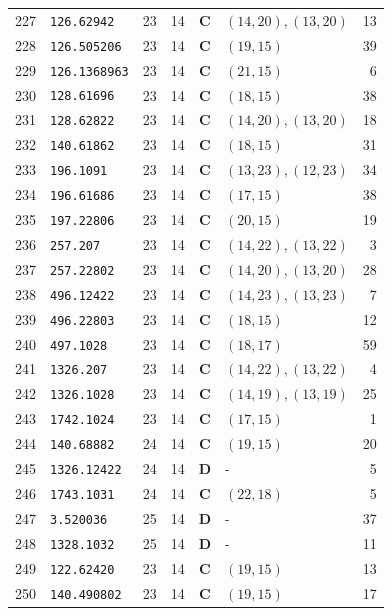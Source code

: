 \documentclass[11pt,a4paper]{article}
\begin{document}
\begin{small}
\begin{longtable}{r l c c c l r}
227 & \texttt{126.62942} & 23 & 14 & \textbf{C} & $(14,20), (13,20)$ & 13 \\
228 & \texttt{126.505206} & 23 & 14 & \textbf{C} & $(19,15)$ & 39 \\
229 & \texttt{126.1368963} & 23 & 14 & \textbf{C} & $(21,15)$ & 6 \\
230 & \texttt{128.61696} & 23 & 14 & \textbf{C} & $(18,15)$ & 38 \\
231 & \texttt{128.62822} & 23 & 14 & \textbf{C} & $(14,20), (13,20)$ & 18 \\
232 & \texttt{140.61862} & 23 & 14 & \textbf{C} & $(18,15)$ & 31 \\
233 & \texttt{196.1091} & 23 & 14 & \textbf{C} & $(13,23), (12,23)$ & 34 \\
234 & \texttt{196.61686} & 23 & 14 & \textbf{C} & $(17,15)$ & 38 \\
235 & \texttt{197.22806} & 23 & 14 & \textbf{C} & $(20,15)$ & 19 \\
236 & \texttt{257.207} & 23 & 14 & \textbf{C} & $(14,22), (13,22)$ & 3 \\
237 & \texttt{257.22802} & 23 & 14 & \textbf{C} & $(14,20), (13,20)$ & 28 \\
238 & \texttt{496.12422} & 23 & 14 & \textbf{C} & $(14,23), (13,23)$ & 7 \\
239 & \texttt{496.22803} & 23 & 14 & \textbf{C} & $(18,15)$ & 12 \\
240 & \texttt{497.1028} & 23 & 14 & \textbf{C} & $(18,17)$ & 59 \\
241 & \texttt{1326.207} & 23 & 14 & \textbf{C} & $(14,22), (13,22)$ & 4 \\
242 & \texttt{1326.1028} & 23 & 14 & \textbf{C} & $(14,19), (13,19)$ & 25 \\
243 & \texttt{1742.1024} & 23 & 14 & \textbf{C} & $(17,15)$ & 1 \\
244 & \texttt{140.68882} & 24 & 14 & \textbf{C} & $(19,15)$ & 20 \\
245 & \texttt{1326.12422} & 24 & 14 & \textbf{D} & - & 5 \\
246 & \texttt{1743.1031} & 24 & 14 & \textbf{C} & $(22,18)$ & 5 \\
247 & \texttt{3.520036} & 25 & 14 & \textbf{D} & - & 37 \\
248 & \texttt{1328.1032} & 25 & 14 & \textbf{D} & - & 11 \\
249 & \texttt{122.62420} & 23 & 14 & \textbf{C} & $(19,15)$ & 13 \\
250 & \texttt{140.490802} & 23 & 14 & \textbf{C} & $(19,15)$ & 17 \\

\end{longtable}
\end{small}
\end{document}
